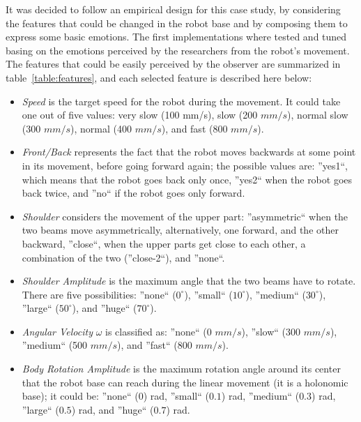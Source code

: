 It was decided to follow an empirical design for this case study, by considering the features that could be changed in the robot base and by composing them to express some basic emotions. The first implementations where tested and tuned basing on the emotions perceived by the researchers from the robot's movement. The features that could be easily perceived by the observer are summarized in table~\ref{table:features}, and each selected feature is described here below:

\begin{itemize}

	\item \textit{Speed} is the target speed for the robot during the movement. It could take one out of five values: very slow (100 mm/s), slow (200 $mm/s$), normal slow (300 $mm/s$), normal (400 $mm/s$), and fast (800 $mm/s$).

	\item \textit{Front/Back} represents the fact that the robot moves backwards at some point in its movement, before going forward again; the possible values are: ''yes1``, which means that the robot goes back only once, ''yes2`` when the robot goes back twice, and ''no`` if the robot goes only forward.

	\item \textit{Shoulder} considers the movement of the upper part: ''asymmetric`` when the two beams move asymmetrically, alternatively, one forward, and the other backward, ''close``, when the upper parts get close to each other, a combination of the two (''close-2``), and ''none``. 

	\item \textit{Shoulder Amplitude} is the maximum angle that the two beams have to rotate. There are five possibilities: ''none`` ($0^\circ$), ''small`` ($10^\circ$), ''medium`` ($30^\circ$), ''large`` ($50^\circ$), and ''huge`` ($70^\circ$).

	\item \textit{Angular Velocity} $\omega$ is classified as: ''none`` (0 $mm/s$), ''slow`` (300 $mm/s$), ''medium`` (500 $mm/s$), and ''fast`` (800 $mm/s$).

	\item \textit{Body Rotation Amplitude} is the maximum  rotation angle around its center that the robot base can reach during the linear movement (it is a holonomic base); it could be: ''none`` ($0$) rad, ''small`` ($0.1$) rad, ''medium`` ($0.3$) rad, ''large`` ($0.5$) rad, and ''huge`` ($0.7$) rad.
\end{itemize}

